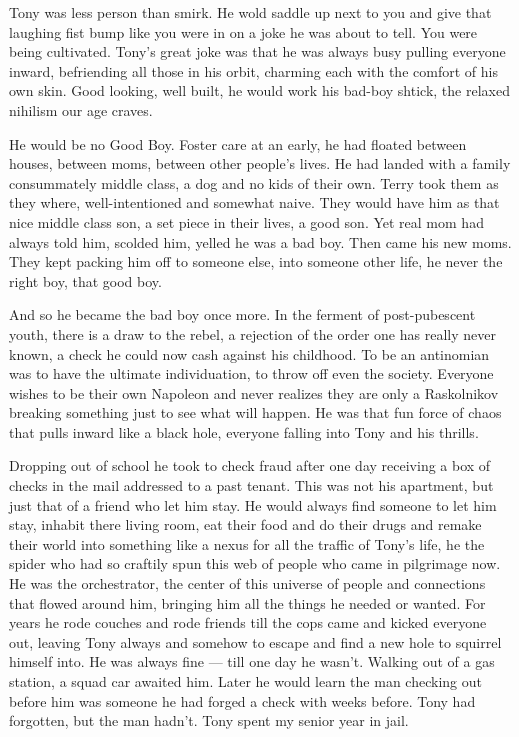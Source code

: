 \documentclass[ebook, 10pt, openright, onecolumn]{memoir}
\newcommand*\td[1]{
  \todo[inline]{
     #1 
  }
}
\begin{document}
Tony was less person than smirk.  He wold saddle up next to you and give that
laughing fist bump like you were in on a joke he was about to tell.  You were
being cultivated.  Tony's great joke was that he was always busy pulling
everyone inward, befriending all those in his orbit, charming each with the
comfort of his own skin.  Good looking, well built, he would work his bad-boy
shtick, the relaxed nihilism our age craves.

He would be no Good Boy.  Foster care at an early, he had floated between
houses, between moms, between other people's lives.  He had landed with a family
consummately middle class, a dog and no kids of their own.  Terry took them as
they where, well-intentioned and somewhat naive.  They would have him as that
nice middle class son, a set piece in their lives, a good son.  Yet real mom had
always told him, scolded him, yelled he was a bad boy.  Then came his new moms.
They kept packing him off to someone else, into someone other life, he never the
right boy, that good boy. 

And so he became the bad boy once more.  In the ferment of post-pubescent youth,
there is a draw to the rebel, a rejection of the order one has really never
known, a check he could now cash against his childhood.  To be an antinomian was
to have the ultimate individuation, to throw off even the society.  Everyone
wishes to be their own Napoleon and never realizes they are only a Raskolnikov
breaking something just to see what will happen. He was that fun force of chaos
that pulls inward like a black hole, everyone falling into Tony and his thrills.

\td{Rework all of this section}

Dropping out of school he took to check fraud after one day receiving a box of
checks in the mail addressed to a past tenant.  This was not his apartment, but
just that of a friend who let him stay. He would always find someone to let him
stay, inhabit there living room, eat their food and do their drugs and remake
their world into something like a nexus for all the traffic of Tony's life, he
the spider who had so craftily spun this web of people who came in pilgrimage
now.  He was the orchestrator, the center of this universe of people and
connections that flowed around him, bringing him all the things he needed or
wanted.  For years he rode couches and rode friends till the cops came and
kicked everyone out, leaving Tony always and somehow to escape and find a new
hole to squirrel himself into.  He was always fine --- till one day he wasn't.
Walking out of a gas station, a squad car awaited him.  Later he would learn
the man checking out before him was someone he had forged a check with weeks
before.  Tony had forgotten, but the man hadn't.  Tony spent my senior year in
jail.
\end{document}
